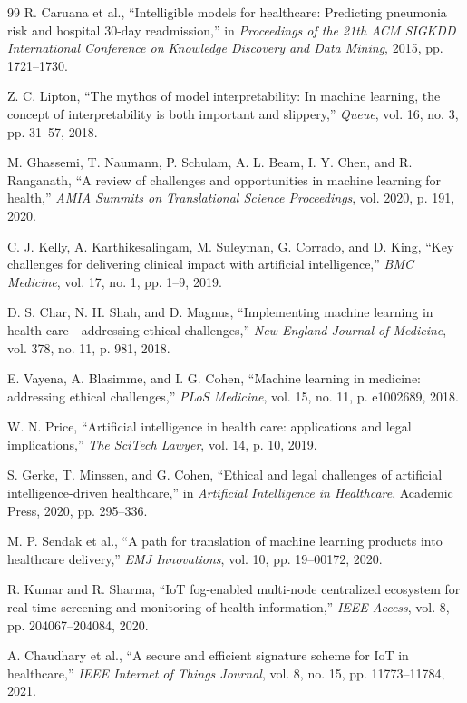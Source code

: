 \documentclass[conference]{IEEEtran}
\begin{document}
\begin{thebibliography}{99}
R. Caruana et al., ``Intelligible models for healthcare: Predicting pneumonia risk and hospital 30-day readmission,'' in \textit{Proceedings of the 21th ACM SIGKDD International Conference on Knowledge Discovery and Data Mining}, 2015, pp. 1721--1730.

Z. C. Lipton, ``The mythos of model interpretability: In machine learning, the concept of interpretability is both important and slippery,'' \textit{Queue}, vol. 16, no. 3, pp. 31--57, 2018.

M. Ghassemi, T. Naumann, P. Schulam, A. L. Beam, I. Y. Chen, and R. Ranganath, ``A review of challenges and opportunities in machine learning for health,'' \textit{AMIA Summits on Translational Science Proceedings}, vol. 2020, p. 191, 2020.

C. J. Kelly, A. Karthikesalingam, M. Suleyman, G. Corrado, and D. King, ``Key challenges for delivering clinical impact with artificial intelligence,'' \textit{BMC Medicine}, vol. 17, no. 1, pp. 1--9, 2019.

D. S. Char, N. H. Shah, and D. Magnus, ``Implementing machine learning in health care—addressing ethical challenges,'' \textit{New England Journal of Medicine}, vol. 378, no. 11, p. 981, 2018.

E. Vayena, A. Blasimme, and I. G. Cohen, ``Machine learning in medicine: addressing ethical challenges,'' \textit{PLoS Medicine}, vol. 15, no. 11, p. e1002689, 2018.

W. N. Price, ``Artificial intelligence in health care: applications and legal implications,'' \textit{The SciTech Lawyer}, vol. 14, p. 10, 2019.

S. Gerke, T. Minssen, and G. Cohen, ``Ethical and legal challenges of artificial intelligence-driven healthcare,'' in \textit{Artificial Intelligence in Healthcare}, Academic Press, 2020, pp. 295--336.

M. P. Sendak et al., ``A path for translation of machine learning products into healthcare delivery,'' \textit{EMJ Innovations}, vol. 10, pp. 19--00172, 2020.

R. Kumar and R. Sharma, ``IoT fog-enabled multi-node centralized ecosystem for real time screening and monitoring of health information,'' \textit{IEEE Access}, vol. 8, pp. 204067--204084, 2020.

A. Chaudhary et al., ``A secure and efficient signature scheme for IoT in healthcare,'' \textit{IEEE Internet of Things Journal}, vol. 8, no. 15, pp. 11773--11784, 2021.


\end{thebibliography}
\end{document}
